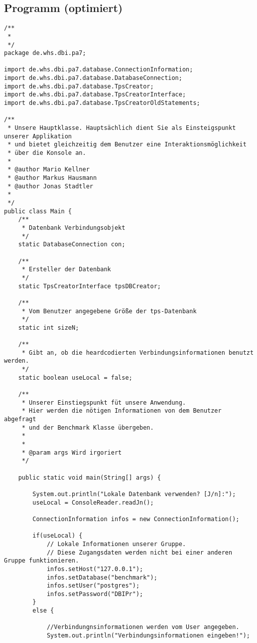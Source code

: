 \subsection{Programm (optimiert)}
\label{app:programmv2}

\begin{lstlisting}[caption={Main}, label={lst:mainv2}]
/**
 * 
 */
package de.whs.dbi.pa7;

import de.whs.dbi.pa7.database.ConnectionInformation;
import de.whs.dbi.pa7.database.DatabaseConnection;
import de.whs.dbi.pa7.database.TpsCreator;
import de.whs.dbi.pa7.database.TpsCreatorInterface;
import de.whs.dbi.pa7.database.TpsCreatorOldStatements;

/**
 * Unsere Hauptklasse. Hauptsächlich dient Sie als Einsteigspunkt unserer Applikation
 * und bietet gleichzeitig dem Benutzer eine Interaktionsmöglichkeit
 * über die Konsole an.
 * 
 * @author Mario Kellner
 * @author Markus Hausmann
 * @author Jonas Stadtler
 *
 */
public class Main {
	/**
	 * Datenbank Verbindungsobjekt
	 */
	static DatabaseConnection con;
	
	/**
	 * Ersteller der Datenbank
	 */
	static TpsCreatorInterface tpsDBCreator;
	
	/**
	 * Vom Benutzer angegebene Größe der tps-Datenbank
	 */
	static int sizeN;
	
	/**
	 * Gibt an, ob die heardcodierten Verbindungsinformationen benutzt werden.
	 */
	static boolean useLocal = false;
	
	/**
	 * Unserer Einstiegspunkt füt unsere Anwendung.
	 * Hier werden die nötigen Informationen von dem Benutzer abgefragt
	 * und der Benchmark Klasse übergeben.
	 * 
	 * 
	 * @param args Wird irgoriert
	 */
	
	public static void main(String[] args) {
		
		System.out.println("Lokale Datenbank verwenden? [J/n]:");
		useLocal = ConsoleReader.readJn();
		
		ConnectionInformation infos = new ConnectionInformation();
		
		if(useLocal) {
			// Lokale Informationen unserer Gruppe.
			// Diese Zugangsdaten werden nicht bei einer anderen Gruppe funktionieren.
			infos.setHost("127.0.0.1");
			infos.setDatabase("benchmark");
			infos.setUser("postgres");
			infos.setPassword("DBIPr");
		}
		else {
			
			//Verbindungnsinformationen werden vom User angegeben.
			System.out.println("Verbindungsinformationen eingeben!");
			

\end{lstlisting}
